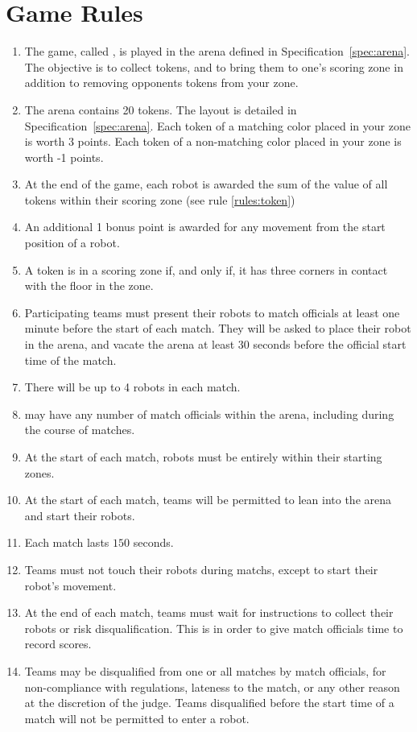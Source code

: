 \section{Game Rules}
\label{sec:rules}

\begin{enumerate}
  \item The game, called \emph{\gamename}, is played in the arena defined in
        Specification~\ref{spec:arena}. The objective is to collect tokens, and
        to bring them to one's scoring zone in addition to removing opponents
        tokens from your zone.
  \item The arena contains 20 tokens. The layout is detailed in
        Specification~\ref{spec:arena}. Each token of a matching color placed
        in your zone is worth 3 points. Each token of a non-matching color
        placed in your zone is worth -1 points.
  \item At the end of the game, each robot is awarded the sum of the value of
        all tokens within their scoring zone (see rule \ref{rules:token})
  \item An additional 1 bonus point is awarded for any movement from the
        start position of a robot.
  \item \label{rules:token}A token is in a scoring zone if, and only if, it
        has three corners in contact with the floor in the zone.
  \item Participating teams must present their robots to match officials at
        least one minute before the start of each match. They will be asked to
        place their robot in the arena, and vacate the arena at least 30
        seconds before the official start time of the match.
  \item There will be up to 4 robots in each match.
  \item \org may have any number of match officials within the arena, including
        during the course of matches.
  \item At the start of each match, robots must be entirely within their
        starting zones.
  \item At the start of each match, teams will be permitted to lean into the
        arena and start their robots.
  \item Each match lasts $150$ seconds.
  \item Teams must not touch their robots during matchs, except to start their
        robot's movement.
  \item At the end of each match, teams must wait for instructions to collect
        their robots or risk disqualification. This is in order to give match
        officials time to record scores.
  \item Teams may be disqualified from one or all matches by match officials,
        for non-compliance with regulations, lateness to the match, or any other
        reason at the discretion of the judge. Teams disqualified before the
        start time of a match will not be permitted to enter a robot.
\end{enumerate}
